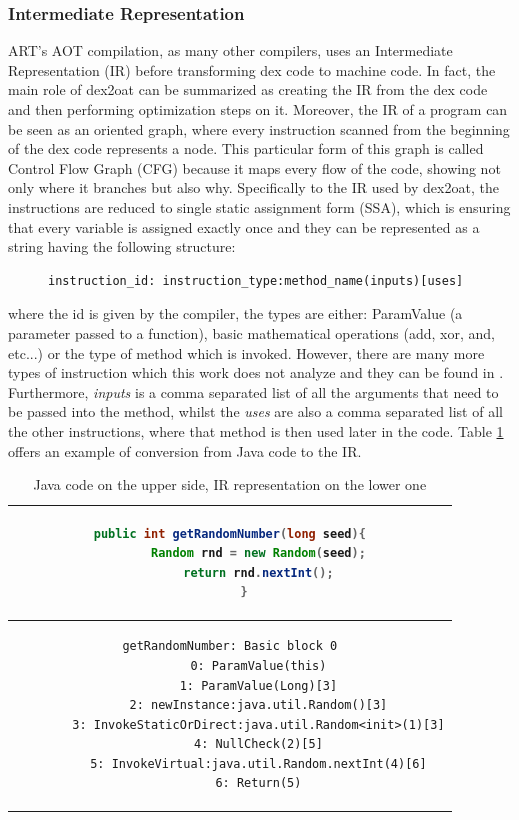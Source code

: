 \subsubsection{Intermediate Representation}
ART's AOT compilation, as many other compilers, uses an Intermediate Representation (IR) before transforming dex code to machine code. In fact, the main role of dex2oat can be summarized as creating the IR from the dex code and then performing optimization steps on it. Moreover, the IR of a program can be seen as an oriented graph, where every instruction scanned from the beginning of the dex code represents a node. This particular form of this graph is called Control Flow Graph (CFG) because it maps every flow of the code, showing not only where it branches but also why. Specifically to the IR used by dex2oat, the instructions are reduced to single static assignment form (SSA), which is ensuring that every variable is assigned exactly once and they can be represented as a string having the following structure:
\begin{figure}[H]
\centering
\begin{BVerbatim}
instruction_id: instruction_type:method_name(inputs)[uses]
\end{BVerbatim}
\end{figure}
where the id is given by the compiler, the types are either: ParamValue (a parameter passed to a function), basic mathematical operations (add, xor, and, etc...) or the type of method which is invoked. However, there are many more types of instruction which this work does not analyze and they can be found in \cite{artist}. Furthermore, \emph{inputs} is a comma separated list of all the arguments that need to be passed into the method, whilst the \emph{uses} are also a comma separated list of all the other instructions, where that method is then used later in the code. Table \ref{tab:exampleAdd} offers an example of conversion from Java code to the IR.\newline

\begin{table}[h!]
  \centering
  \begin{tabular}{|c|}
  	\hline
	\begin{lstlisting}[language=Java]
	public int getRandomNumber(long seed){
		Random rnd = new Random(seed);
		return rnd.nextInt();
	}
	\end{lstlisting}\\
	\hline
	\begin{lstlisting}[language={[x86masm]Assembler}]
		getRandomNumber: Basic block 0
		0: ParamValue(this)
		1: ParamValue(Long)[3]
		2: newInstance:java.util.Random()[3]
		3: InvokeStaticOrDirect:java.util.Random<init>(1)[3]
		4: NullCheck(2)[5]
		5: InvokeVirtual:java.util.Random.nextInt(4)[6]
		6: Return(5)
	\end{lstlisting} \\
	\hline
  \end{tabular}
    \caption{Java code on the upper side, IR representation on the lower one}
	\label{tab:exampleAdd}
\end{table}

